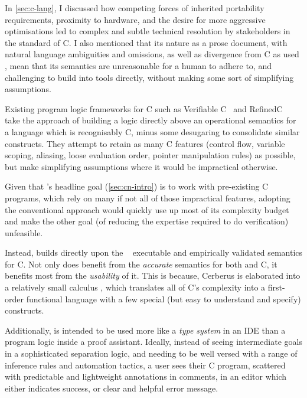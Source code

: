 In \cref{sec:c-lang}, I discussed how competing forces of inherited
portability requirements, proximity to hardware, and the desire for more
aggressive optimisations led to complex and subtle technical resolution by
stakeholders in the  standard of C. I also mentioned that its nature as
a prose document, with natural language ambiguities and omissions, as well as
divergence from C as used , mean that its semantics are unreasonable
for a human to adhere to, and challenging to build into tools directly,
without making some sort of simplifying assumptions.

Existing program logic frameworks for C such as Verifiable C~
and RefinedC~ take the approach of building a
logic directly above an operational semantics for a language which is
recognisably C, minus some desugaring to consolidate similar constructs. They
attempt to retain as many C features (control flow, variable scoping, aliasing,
loose evaluation order, pointer manipulation rules) as possible, but make
simplifying assumptions where it would be impractical otherwise.

Given that 's headline goal (\cref{sec:cn-intro}) is to work with
pre-existing C programs, which rely on many if not all of those impractical
features, adopting the conventional approach would quickly use up most of its
complexity budget and make the other goal (of reducing the expertise required
to do verification) unfeasible.

Instead,  builds directly upon the
~ executable and empirically
validated semantics for C. Not only does  benefit from the
\emph{accurate} semantics for both  and  C, it benefits
most from the \emph{usability} of it. This is because, Cerberus is elaborated
into a relatively small calculus \emph{}, which translates all of C's
complexity into a first-order functional language with a few special (but easy
to understand and specify) constructs.

Additionally,  is intended to be used more like a \emph{type system} in
an IDE than a program logic inside a proof assistant. Ideally, instead of
seeing intermediate goals in a sophisticated separation logic, and needing to
be well versed with a range of inference rules and automation tactics, a user
sees their C program, scattered with predictable and lightweight annotations in
comments, in an editor which either indicates success, or clear and helpful
error message.

